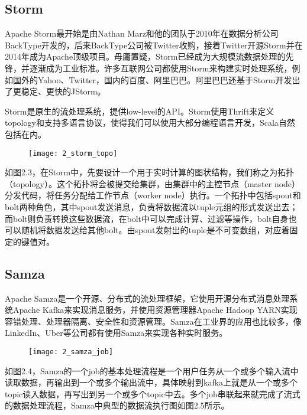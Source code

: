 \subsection{Storm}

Apache Storm\citep{storm}最开始是由Nathan Marz和他的团队于2010年在数据分析公司BackType开发的，后来BackType公司被Twitter收购，接着Twitter开源Storm并在2014年成为Apache顶级项目。毋庸置疑，Storm已经成为大规模流数据处理的先锋，并逐渐成为工业标准。许多互联网公司都使用Storm来构建实时处理系统，例如国外的Yahoo、Twitter，国内的百度、阿里巴巴。阿里巴巴还基于Storm开发出了更稳定、更快的JStorm\citep{jstorm}。

Storm是原生的流处理系统，提供low-level的API。Storm使用Thrift来定义topology和支持多语言协议，使得我们可以使用大部分编程语言开发，Scala自然包括在内。

\begin{figure}[!htbp]
    \centering
    \texttt{[image: 2\_storm\_topo]}
    \label{fig:2_storm_topo}
\end{figure}

如图2.3，在Storm中，先要设计一个用于实时计算的图状结构，我们称之为拓扑（topology）。这个拓扑将会被提交给集群，由集群中的主控节点（master node）分发代码，将任务分配给工作节点（worker node）执行。一个拓扑中包括spout和bolt两种角色，其中spout发送消息，负责将数据流以tuple元组的形式发送出去；而bolt则负责转换这些数据流，在bolt中可以完成计算、过滤等操作，bolt自身也可以随机将数据发送给其他bolt。由spout发射出的tuple是不可变数组，对应着固定的键值对。

\subsection{Samza}

Apache Samza\citep{samza}是一个开源、分布式的流处理框架，它使用开源分布式消息处理系统Apache Kafka来实现消息服务，并使用资源管理器Apache Hadoop YARN实现容错处理、处理器隔离、安全性和资源管理。Samza在工业界的应用也比较多，像LinkedIn、Uber等公司都有使用Samza来实现各种实时服务。

\begin{figure}[!htbp]
    \centering
    \texttt{[image: 2\_samza\_job]}
    \label{fig:2_samza_job}
\end{figure}

如图2.4，Samza的一个job的基本处理流程是一个用户任务从一个或多个输入流中读取数据，再输出到一个或多个输出流中，具体映射到kafka上就是从一个或多个topic读入数据，再写出到另一个或多个topic中去。多个job串联起来就完成了流式的数据处理流程，Samza中典型的数据流执行图如图2.5所示。


